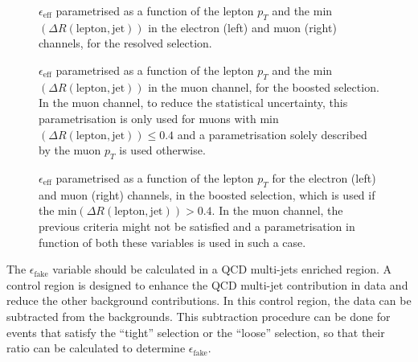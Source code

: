 \begin{figure}
\centering
{}
\caption{$\epsilon_{\mathrm{eff}}$ parametrised as a function of the lepton $p_T$ and the min $(\Delta R(\textrm{lepton}, \textrm{jet}))$ in the electron (left) and muon (right) channels, for the resolved selection.}
\label{fig:ttres8_qcd_eff_resolved_lepPtdR}
\end{figure}

\begin{figure}
\centering
{}
\caption{$\epsilon_{\mathrm{eff}}$ parametrised as a function of the lepton $p_T$ and the min $(\Delta R(\textrm{lepton}, \textrm{jet}))$ in the muon channel, for the boosted selection. In the muon channel, to reduce the statistical uncertainty, this parametrisation is only used for muons with min $(\Delta R(\textrm{lepton}, \textrm{jet})) \leq 0.4$ and a parametrisation solely described by the muon $p_T$ is used otherwise.}
\label{fig:ttres8_qcd_eff_boosted_lepPtdR}
\end{figure}

\begin{figure}
\centering
{}
\caption{$\epsilon_{\mathrm{eff}}$ parametrised as a function of the lepton $p_T$ for the electron (left) and muon (right) channels, in the boosted selection, which is used if the $\textrm{min}(\Delta R(\textrm{lepton}, \textrm{jet})) > 0.4$. In the muon channel, the previous criteria might not be satisfied and a parametrisation in function of both these variables is used in such a case.}
\label{fig:ttres8_qcd_eff_boosted_lepPt04dR}
\end{figure}

The $\epsilon_{\textrm{fake}}$ variable should be calculated
in a QCD multi-jets enriched region.
A control region is designed to enhance the QCD multi-jet contribution in data and reduce the other background contributions. In this control
region, the data can be subtracted from the backgrounds. This subtraction
procedure can be done for events that satisfy the ``tight'' selection or the ``loose'' selection, so that their ratio can be calculated to
determine $\epsilon_{\textrm{fake}}$.

